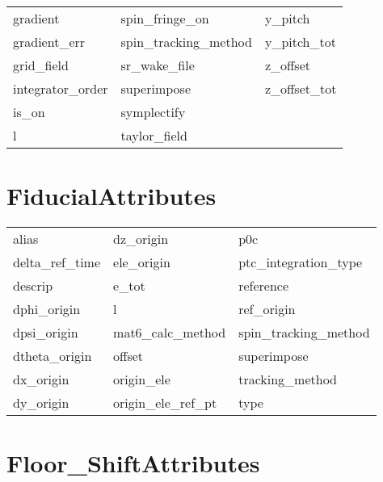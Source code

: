 \begin{tabular}{lll}
gradient                    & spin_fringe_on              & y_pitch                     \\
gradient_err                & spin_tracking_method        & y_pitch_tot                 \\
grid_field                  & sr_wake_file                & z_offset                    \\
integrator_order            & superimpose                 & z_offset_tot                \\
is_on                       & symplectify                 &                             \\
l                           & taylor_field                &                             \\
 \bottomrule
 \end{tabular}
 \vfill
 
 \section{FiducialAttributes}
 \label{s:list.fiducial}
 
 \begin{tabular}{lll} \toprule
alias                       & dz_origin                   & p0c                         \\
delta_ref_time              & ele_origin                  & ptc_integration_type        \\
descrip                     & e_tot                       & reference                   \\
dphi_origin                 & l                           & ref_origin                  \\
dpsi_origin                 & mat6_calc_method            & spin_tracking_method        \\
dtheta_origin               & offset                      & superimpose                 \\
dx_origin                   & origin_ele                  & tracking_method             \\
dy_origin                   & origin_ele_ref_pt           & type                        \\
 \bottomrule
 \end{tabular}
 \vfill
 
 \section{Floor_ShiftAttributes}
 \label{s:list.floor.shift}
 
